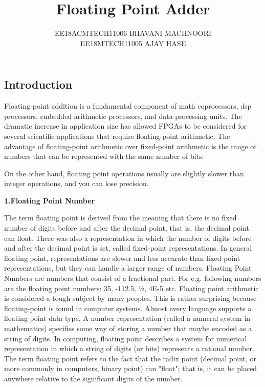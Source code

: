 \documentclass{article}
\title{Floating Point Adder}
\author{EE18ACMTECH11006 BHAVANI MACHNOORI\\EE18MTECH11005 AJAY HASE}
\begin{document}
\maketitle

\begin{center}
\section{Introduction}
\end{center}
\bigskip 

     Floating-point addition is a fundamental component of math coprocessors, dsp processors,
  embedded arithmetic processors, and data processing units.
The dramatic increase in application size has allowed FPGAs to be considered for several scientific applications that require floating-point arithmetic. The advantage of floating-point arithmetic over fixed-point arithmetic is the range of numbers that can be represented with the same number of bits.

On the other hand, floating point operations usually are slightly slower than integer operations, and you can lose precision.
 
\bigskip 
\textbf{1.Floating Point Number }
\bigskip 

	The term floating point is derived from the meaning that there is no fixed number of digits before and after the decimal point, that is, the decimal point can float. There was also a representation in which the number of digits before and after the decimal point is set, called fixed-point representations. In general floating point, representations are slower and less accurate than fixed-point representations, but they can handle a larger range of numbers. Floating Point Numbers are numbers that consist of a fractional part. For e.g. following numbers are the floating point numbers: 35, -112.5, ½, 4E-5 etc. Floating point arithmetic is considered a tough subject by many peoples. This is rather surprising because floating-point is found in computer systems. Almost every language supports a floating point data type. A number representation (called a numeral system in mathematics) specifies some way of storing a number that maybe encoded as a string of digits. In computing, floating point describes a system for numerical representation in which a string of digits (or bits) represents a rational number. The term floating point refers to the fact that the radix point (decimal point, or more commonly in computers, binary point) can "float"; that is, it can be placed anywhere relative to the significant digits of the number.
 
\end{document}
